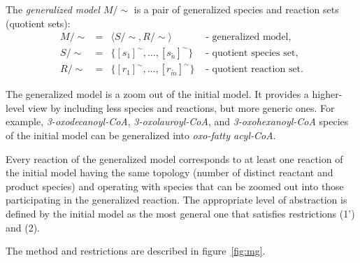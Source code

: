 \documentclass[9pt]{article}
\newcounter{fig}
\newcounter{def}
\begin{document}
The \emph{generalized model $M/\sim$} is a pair of generalized species and reaction sets (quotient sets):
\[ \begin{array}{ccll}
\mbox{$M/\sim$} & \mbox{$=$} & \mbox{$\langle S/\sim, R/\sim \rangle$} & \mbox{ - generalized model,} \\
\mbox{$S/\sim$} & \mbox{$=$} & \mbox{$\{[s_1]^{\sim}, \ldots, [s_{\tilde{n}}]^{\sim}\}$} &  \mbox{ - quotient species set,} \\
\mbox{$R/\sim$} & \mbox{$=$} & \mbox{$\{[r_1]^{\sim}, \ldots, [r_{\tilde{m}}]^{\sim}\}$} &  \mbox{ - quotient reaction set.} 
\end{array} \]

The generalized model is a zoom out of the initial model. It provides a higher-level view by including less species and reactions, but more generic ones. For example, \textit{3-oxodecanoyl-CoA}, \textit{3-oxolauroyl-CoA}, and \textit{3-oxohexanoyl-CoA} species of the initial model can be generalized into \textit{oxo-fatty acyl-CoA}. 

Every reaction of the generalized model corresponds to at least one reaction of the initial model having the same topology (number of distinct reactant and product species) and operating with species that can be zoomed out into those participating in the generalized reaction. The appropriate level of abstraction is defined by the initial model as the most general one that satisfies restrictions (1') and (2).

The method and restrictions are described in figure~\ref{fig:mg}.
\end{document}
